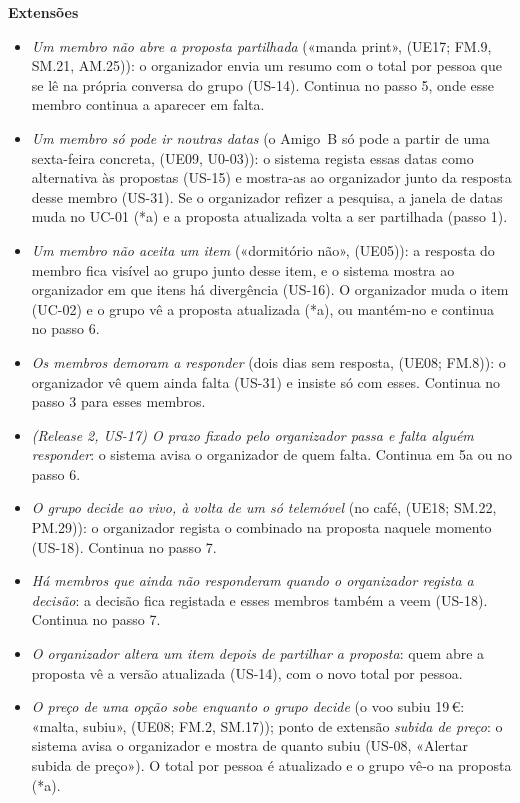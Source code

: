 \documentclass[11pt,a4paper]{article}
\newcommand{\reg}[1]{{\footnotesize\textcolor{pendente}{(#1)}}}
\newenvironment{usecase}[2]{%
  \par\medskip\noindent{\large\bfseries\color{roamly}#1: #2}\par\smallskip\small\noindent\ignorespaces}{\par\medskip}
\begin{document}
\begin{usecase}{UC-04}{Levar o grupo a decidir sobre a proposta}
\textbf{Extensões}
\begin{itemize}[leftmargin=2.2em]
  \item[2a.] \textit{Um membro não abre a proposta partilhada} («manda print», \reg{UE17; FM.9, SM.21, AM.25}): o organizador envia um resumo com o total por pessoa que se lê na própria conversa do grupo (US-14). Continua no passo 5, onde esse membro continua a aparecer em falta.
  \item[3a.] \textit{Um membro só pode ir noutras datas} (o Amigo~B só pode a partir de uma sexta-feira concreta, \reg{UE09, U0-03}): o sistema regista essas datas como alternativa às propostas (US-15) e mostra-as ao organizador junto da resposta desse membro (US-31). Se o organizador refizer a pesquisa, a janela de datas muda no UC-01 (*a) e a proposta atualizada volta a ser partilhada (passo 1).
  \item[4a.] \textit{Um membro não aceita um item} («dormitório não», \reg{UE05}): a resposta do membro fica visível ao grupo junto desse item, e o sistema mostra ao organizador em que itens há divergência (US-16). O organizador muda o item (UC-02) e o grupo vê a proposta atualizada (*a), ou mantém-no e continua no passo 6.
  \item[5a.] \textit{Os membros demoram a responder} (dois dias sem resposta, \reg{UE08; FM.8}): o organizador vê quem ainda falta (US-31) e insiste só com esses. Continua no passo 3 para esses membros.
  \item[5b.] \textit{(Release 2, US-17) O prazo fixado pelo organizador passa e falta alguém responder}: o sistema avisa o organizador de quem falta. Continua em 5a ou no passo 6.
  \item[6a.] \textit{O grupo decide ao vivo, à volta de um só telemóvel} (no café, \reg{UE18; SM.22, PM.29}): o organizador regista o combinado na proposta naquele momento (US-18). Continua no passo 7.
  \item[6b.] \textit{Há membros que ainda não responderam quando o organizador regista a decisão}: a decisão fica registada e esses membros também a veem (US-18). Continua no passo 7.
  \item[*a.] \textit{O organizador altera um item depois de partilhar a proposta}: quem abre a proposta vê a versão atualizada (US-14), com o novo total por pessoa.
  \item[*b.] \textit{O preço de uma opção sobe enquanto o grupo decide} (o voo subiu 19\,€: «malta, subiu», \reg{UE08; FM.2, SM.17}); ponto de extensão \textit{subida de preço}: o sistema avisa o organizador e mostra de quanto subiu (US-08, «Alertar subida de preço»). O total por pessoa é atualizado e o grupo vê-o na proposta (*a).
\end{itemize}


\end{usecase}
\end{document}
